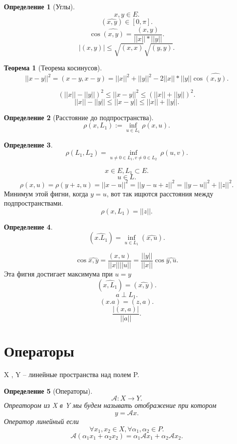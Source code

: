 \documentclass{scrartcl}
\newtheorem{theorem}{Теорема}
\newtheorem{definition}{Определение}
\begin{document}
\begin{definition}[Углы]
    \[
    x,y \in E
    .\] 
    \[
        (\widehat{x,y}) \in [0, \pi]
    .\] 
    \[
        \cos{\widehat{( x,y )}} = \frac{(x,y)}{||x|| * ||y||}
    .\] 
    \[
    |(x,y)| \le  \sqrt{(x,x)}  \sqrt{(y,y)} 
    .\] 
\end{definition}
\begin{theorem}[Теорема косинусов]
    \[
        ||x - y|| ^{2} = (x-y,x-y) = ||x||^{2} + ||y||^{2} - 2||x|| *||y|| \cos{\widehat{( x,y )}}
    .\] 
\end{theorem}
\[
  (||x|| - ||y||)^{2} \le  ||x - y|| ^{2} \le  (||x|| + ||y||)^{2}
.\] 
\[
||x || - || y|| \le  ||x - y|| \le  ||x|| + ||y||
.\] 
\begin{definition}[Расстояние до подпространства]
    \[
        \rho(x,L_1) := \inf_{u \in L_1}{\rho(x,u)}
    .\] 
\end{definition}
\begin{definition}
    \[
        \rho( L_1,L_2 ) = \inf_{u \neq 0 \in L_1 , v \neq 0 \in L_2}~ \rho(u,v)
    .\] 
\end{definition}
\[
x \in E, L_1 \subset E
.\] 
\[
u \in L
.\] 
\[
    \rho(x,u) = \rho(y + z,u)= ||x - u||^{2} = ||y - u + z||^{2} = ||y - u||^{2} + ||z||^{2}
.\]
Минимум этой фигни, когда $y = u$, вот так ищются расстояния между подпространствами.
 \[
\rho(x,L_1) = ||z||
.\] 
\begin{definition}
    \[
        (\widehat{x.L_1}) = \inf_{u \in L_1} (\widehat{x,u})
    .\] 
\end{definition}
\[
    \cos{\widehat{x,y}} = \frac{(x,u)}{||x|| ||u||} = \frac{||y||}{||x||} \cos{\widehat{y,u}}
.\] 
Эта фигня достигает максимума при $u = y$
\[
    (\widehat{x,L_1}) = (\widehat{x,y})
.\] 
\[
a \perp L_1
.\] 
\[
    (x.a) = (z,a)
.\] 
\[
\frac{|(x,a)|}{||a||}
.\] 
\section{Операторы}
X , Y -- линейные пространства над полем P.
\begin{definition}[Операторы]
    \[
        \mathcal{A} : X \to Y
    .\] 
    Опреатором из X в Y мы будем называть отображение при котором
    \[
        y = \mathcal{A} x
    .\] 
    Оператор линейный если
    \[
    \forall  x_1, x_2 \in X , \forall  \alpha_{1} ,\alpha_{2} \in P
    .\] 
    \[
        \mathcal{A} (\alpha_{1} x_1 + \alpha_{2}x_2) = \alpha_1 \mathcal{A}x_1 +
        \alpha_2 \mathcal{A} x_{2}
    .\] 
\end{definition}
\end{document}
